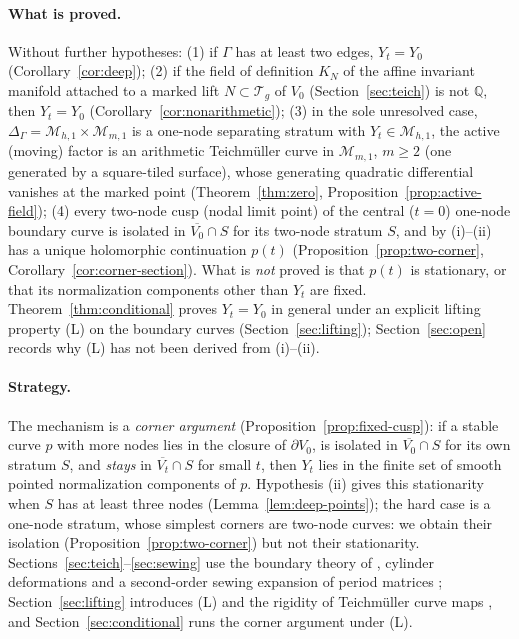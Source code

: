 \documentclass[11pt]{article}
\newcommand{\M}{\mathcal M}
\newcommand{\T}{\mathcal T}
\newcommand{\cl}[1]{\overline{#1}}
\theoremstyle{remark}
\begin{document}
\paragraph{What is proved.}
Without further hypotheses: (1) if \(\Gamma\) has at least two
edges, \(Y_t=Y_0\) (Corollary~\ref{cor:deep}); (2) if the field of
definition \(K_N\) of the affine invariant manifold attached to a
marked lift \(N\subset\T_g\) of \(V_0\) (Section~\ref{sec:teich}) is
not \(\mathbb Q\), then \(Y_t=Y_0\)
(Corollary~\ref{cor:nonarithmetic}); (3) in the sole unresolved case,
\(\Delta_\Gamma=\M_{h,1}\times\M_{m,1}\) is a one-node separating
stratum with \(Y_t\in\M_{h,1}\), the active (moving) factor is an
arithmetic Teichm\"uller curve in \(\M_{m,1}\), \(m\ge2\) (one
generated by a square-tiled surface), whose generating quadratic
differential vanishes at the marked point
(Theorem~\ref{thm:zero}, Proposition~\ref{prop:active-field});
(4) every two-node cusp (nodal limit point) of the central (\(t=0\))
one-node boundary curve is isolated in \(\cl{V_0}\cap S\) for its
two-node stratum \(S\), and by (i)--(ii) has a unique holomorphic
continuation
\(p(t)\) (Proposition~\ref{prop:two-corner},
Corollary~\ref{cor:corner-section}).
What is \emph{not} proved is that \(p(t)\) is stationary, or that
its normalization components other than \(Y_t\) are fixed.
Theorem~\ref{thm:conditional} proves \(Y_t=Y_0\) in general under an
explicit lifting property (L) on the boundary curves
(Section~\ref{sec:lifting}); Section~\ref{sec:open} records why (L)
has not been derived from (i)--(ii).

\paragraph{Strategy.}
The mechanism is a \emph{corner argument}
(Proposition~\ref{prop:fixed-cusp}): if a stable curve \(p\) with
more nodes lies in the closure of \(\partial V_0\), is isolated in
\(\cl{V_0}\cap S\) for its own stratum \(S\), and \emph{stays} in
\(\cl{V_t}\cap S\) for small \(t\), then \(Y_t\) lies in the finite
set of smooth pointed normalization components of \(p\).
Hypothesis (ii) gives this stationarity when \(S\) has at
least three nodes (Lemma~\ref{lem:deep-points}); the hard case is a
one-node stratum, whose simplest corners are two-node curves: we
obtain their isolation (Proposition~\ref{prop:two-corner}) but not
their stationarity. Sections~\ref{sec:teich}--\ref{sec:sewing} use the
boundary theory of \cite{AHW}, cylinder deformations
\cite{WrightCylinder} and a second-order sewing expansion of period
matrices \cite{HuNorton}; Section~\ref{sec:lifting} introduces (L)
and the rigidity of Teichm\"uller curve maps \cite{McMullen}, and
Section~\ref{sec:conditional} runs the corner argument under (L).
\end{document}
